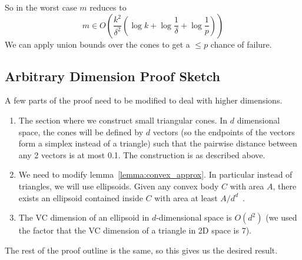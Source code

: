 So in the worst case $m$ reduces to
\[ m \in O\left(\frac{k^2}{\delta^2}\left(\log{k} + \log{\frac{1}{\delta} + \log{\frac{1}{p}} }\right)\right) \]
We can apply union bounds over the cones to get a $\leq p$ chance of failure.

\subsection{Arbitrary Dimension Proof Sketch}

A few parts of the proof need to be modified to deal with higher dimensions.
\begin{enumerate}
\item The section where we construct small triangular cones. In $d$ dimensional space, the cones will be defined by $d$ vectors (so the endpoints of the vectors form a simplex instead of a triangle) such that the pairwise distance between any 2 vectors is at most 0.1. The construction is as described above.
\item We need to modify lemma~\ref{lemma:convex_approx}. In particular instead of triangles, we will use ellipsoids. Given any convex body $C$ with area $A$, there exists an ellipsoid contained inside $C$ with area at least $A/d^d$~\cite{geom_approx_algs}.
\item The VC dimension of an ellipsoid in $d$-dimensional space is $O(d^2)$ (we used the factor that the VC dimension of a triangle in 2D space is 7).
\end{enumerate}
The rest of the proof outline is the same, so this gives us the desired result.